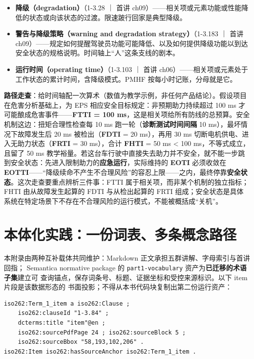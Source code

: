 \begin{itemize}
\item \textbf{降级（degradation）}（1-3.28 ｜ 首讲 ch09）——相关项或元素功能或性能降低的状态或向该状态的过渡。限速跛行回家是典型降级。
\item \textbf{警告与降级策略（warning and degradation strategy）}（1-3.183 ｜ 首讲 ch09）——规定如何提醒驾驶员功能可能降低、以及如何提供降级功能以到达安全状态的规格说明。时间轴上“人”这条支线的剧本。
\item \textbf{运行时间（operating time）}（1-3.103 ｜ 首讲 ch06）——相关项或元素处于工作状态的累计时间，含降级模式。PMHF 按每小时记账，分母就是它。
\end{itemize}

\textbf{路径走查}：给时间轴配一次算术（数值为教学示例，非任何产品结论）。假设项目在危害分析基础上，为 EPS 相应安全目标规定：非预期助力持续超过 100 ms 才可能酿成危害事件——\textbf{FTTI = 100 ms}，这是相关项给所有防线的总预算。安全机制这边：扭矩合理性检查每 10 ms 跑一轮（\textbf{诊断测试时间间隔} 10 ms），最坏情况下故障发生后 20 ms 被检出（\textbf{FDTI} = 20 ms），再用 30 ms 切断电机供电、进入无助力状态（\textbf{FRTI} = 30 ms），合计 \textbf{FHTI} = 50 ms < 100 ms，不等式成立，且留了 50 ms 教学裕量。若这台车行驶中直接失去助力并不安全，就不能一步跳到安全状态：先进入限制助力的\textbf{应急运行}，实际维持的 \textbf{EOTI} 必须收敛在\textbf{EOTTI}——“降级续命不产生不合理风险”的容忍上限——之内，最终停靠\textbf{安全状态}。这次走查要重点辨析三件事：FTTI 属于相关项，而非某个机制的独立指标；FHTI 由从故障发生起算的 FDTI 与从检出起算的 FRTI 组成；安全状态是具体系统在特定场景下不存在不合理风险的运行模式，不能被概括成“关机”。


\section{本体化实践：一份词表、多条概念路径}

本附录由两种互补载体共同维护：Markdown 正文承担五群讲解、字母索引与首讲回指；
Semantica normative package 的 \nolinkurl{part1-vocabulary} 资产为\textbf{已迁移的术语子集}建立可
查询锚点，保存词条号、标题、证据坐标和受控来源标识。以下 item 片段是该数据形态的
书面投影；不得从本书代码块复制出第二份运行资产：

\nopagebreak[4]
\begin{codebox}
\begin{Verbatim}[fontsize=\small,breaklines=true,breakanywhere=true,breaksymbolleft={},breaksymbolright={}]
iso262:Term_1_item a iso262:Clause ;
    iso262:clauseId "1-3.84" ;
    dcterms:title "item"@en ;
    iso262:sourcePdfPage 24 ; iso262:sourceBlock 5 ;
    iso262:sourceBbox "58,193,102,206" .
iso262:Item iso262:hasSourceAnchor iso262:Term_1_item .
\end{Verbatim}
\end{codebox}

